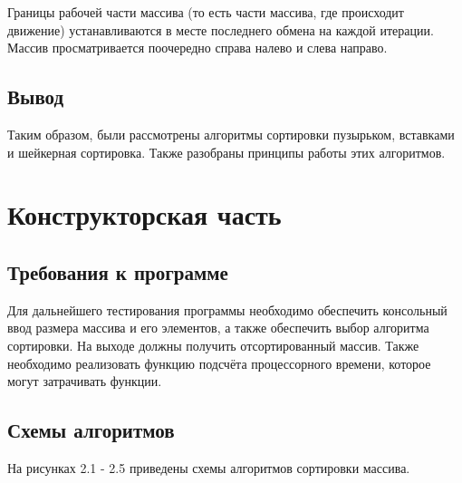 \documentclass[12pt,a4paper]{report}
\begin{document}
Границы рабочей части массива (то есть части массива, где происходит движение) устанавливаются в месте последнего обмена на каждой 
итерации. 
Массив просматривается поочередно справа налево и слева направо.

\section{Вывод}

Таким образом, были рассмотрены алгоритмы сортировки пузырьком, вставками и шейкерная сортировка.
Также разобраны принципы работы этих алгоритмов.

\newpage
\chapter{Конструкторская часть}

\section{Требования к программе}

Для дальнейшего тестирования программы необходимо обеспечить консольный ввод размера массива и его элементов, а также обеспечить 
выбор алгоритма сортировки.
На выходе должны получить отсортированный массив.
Также необходимо реализовать функцию подсчёта процессорного времени, которое могут затрачивать функции.

\section{Схемы алгоритмов}

На рисунках 2.1 - 2.5 приведены схемы алгоритмов сортировки массива.
\end{document}
